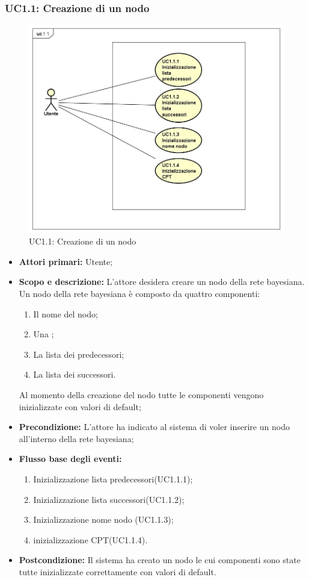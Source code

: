 \subsubsection{UC1.1: Creazione di un nodo} 
\begin{figure} [H]
	\centering
	\includegraphics[scale=0.45]{Img/UC1-1} 
	\caption{UC1.1: Creazione di un nodo} \label{} 
\end{figure} 
\begin{itemize} 
	\item{\textbf{Attori primari:} Utente;} 
	\item{\textbf{Scopo e descrizione:} L'attore desidera creare un nodo della rete bayesiana. Un nodo della rete bayesiana è composto da quattro componenti: 
	\begin{enumerate} 
		\item{Il nome del nodo;} 
		\item{Una ;} 
		\item{La lista dei predecessori;} 
		\item{La lista dei successori.} 
	\end{enumerate} 
Al momento della creazione del nodo tutte le componenti vengono inizializzate con valori di default;} 
	\item{\textbf{Precondizione:} L'attore ha indicato al sistema di voler inserire un nodo all'interno della rete bayesiana;} 
	\item{\textbf{Flusso base degli eventi:} } 
		\begin{enumerate} 
			\item{Inizializzazione lista predecessori(UC1.1.1);} 
			\item{Inizializzazione lista successori(UC1.1.2);} 
			\item{Inizializzazione nome nodo (UC1.1.3);} 
			\item{inizializzazione CPT(UC1.1.4).} 
		\end{enumerate} 
	\item{\textbf{Postcondizione:} Il sistema ha creato un nodo le cui componenti sono state tutte inizializzate correttamente con valori di default.} 
\end{itemize} 
